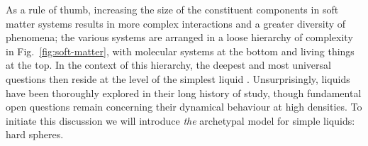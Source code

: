 \documentclass[11pt,twoside]{report}
\begin{document}
As a rule of thumb, increasing the size of the constituent components in soft matter systems results in more complex interactions and a greater diversity of phenomena; the various systems are arranged in a loose hierarchy of complexity in Fig.\ \ref{fig:soft-matter}, with molecular systems at the bottom and living things at the top.
In the context of this hierarchy,
the deepest and most universal questions then reside at the level of the simplest liquid%
.
Unsurprisingly, liquids have been thoroughly explored in their long history of study, though fundamental open questions remain concerning their dynamical behaviour at high densities.
To initiate this discussion we will introduce \emph{the} archetypal model for simple liquids: hard spheres.
\end{document}
